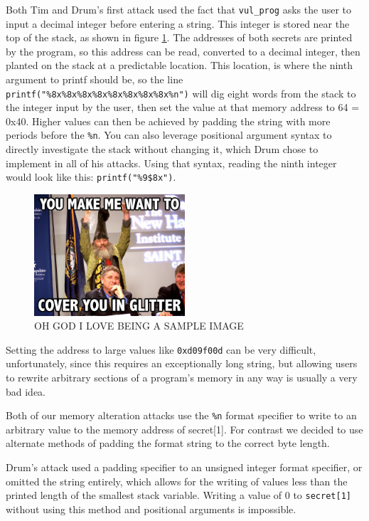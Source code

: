 Both Tim and Drum's first attack used the fact that {\tt vul\_prog} asks the user to input a decimal integer before
entering a string. This integer is stored near the top of the stack, as shown in figure \ref{fig_vul_prog_stack}. The
addresses of both secrets are printed by the program, so this address can be read, converted to a decimal integer, then
planted on the stack at a predictable location. This location, is where the ninth argument to printf should be, so the
line {\tt printf("\%8x\%8x\%8x\%8x\%8x\%8x\%8x\%8x\%n")} will dig eight words from the stack to the integer input by the
user, then set the value at that memory address to 64 = 0x40. Higher values can then be achieved by padding the string
with more periods before the {\tt \%n}. You can also leverage positional argument syntax to directly investigate the
stack without changing it, which Drum chose to implement in all of his attacks. Using that syntax, reading the ninth
integer would look like this: {\tt printf("\%9\$8x")}.

\begin{figure}[ht]
	\centering
	\includegraphics[width = 0.5\textwidth]{./images/placeholder.jpg}
	\caption{OH GOD I LOVE BEING A SAMPLE IMAGE}
	\label{fig_vul_prog_stack}
\end{figure}

Setting the address to large values like {\tt 0xd09f00d} can be very difficult, unfortunately, since this requires an
exceptionally long string, but allowing users to rewrite arbitrary sections of a program's memory in any way is usually
a very bad idea.

Both of our memory alteration attacks use the {\tt \%n} format specifier to write to an arbitrary value to the memory
address of secret[1]. For contrast we decided to use alternate methods of padding the format string to the correct byte
length.

Drum's attack used a padding specifier to an unsigned integer format specifier, or omitted the string entirely,
which allows for the writing of values less than the printed length of the smallest stack variable. Writing a value of
0 to {\tt secret[1]} without using this method and positional arguments is impossible.

